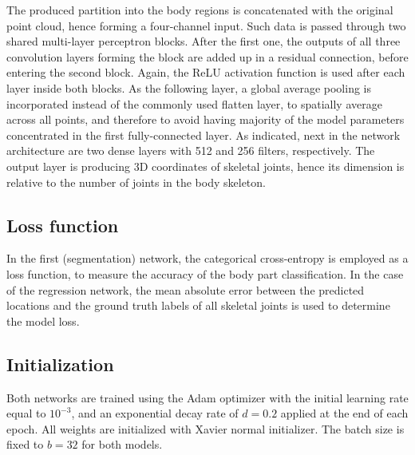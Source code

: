 \noindent The produced partition into the body regions is concatenated with the original point cloud, hence forming a four-channel input. Such data is passed through two shared multi-layer perceptron blocks. After the first one, the outputs of all three convolution layers forming the block are added up in a residual connection, before entering the second block. Again, the ReLU activation function is used after each layer inside both blocks. As the following layer, a global average pooling is incorporated instead of the commonly used flatten layer, to spatially average across all points, and therefore to avoid having majority of the model parameters concentrated in the first fully-connected layer. As indicated, next in the network architecture are two dense layers with 512 and 256 filters, respectively. The output layer is producing 3D coordinates of skeletal joints, hence its dimension is relative to the number of joints in the body skeleton.


\subsection{Loss function}
In the first (segmentation) network, the categorical cross-entropy is employed as a loss function, to measure the accuracy of the body part classification. In the case of the regression network, the mean absolute error between the predicted locations and the ground truth labels of all skeletal joints is used to determine the model loss.

\subsection{Initialization}
Both networks are trained using the Adam optimizer with the initial learning rate equal to $10^{-3}$, and an exponential decay rate of $d=0.2$ applied at the end of each epoch. All weights are initialized with Xavier normal initializer. The batch size is fixed to $b=32$ for both models.

